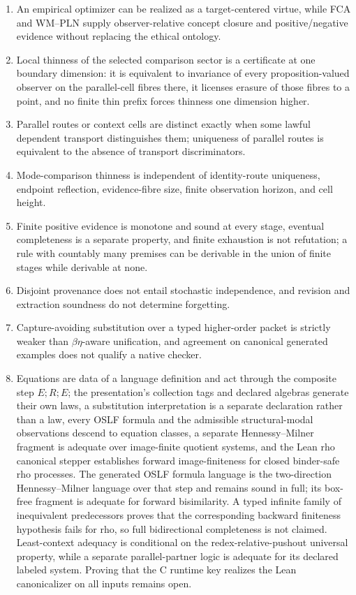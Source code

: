 \documentclass[11pt]{article}
\theoremstyle{definition}
\theoremstyle{remark}
\begin{document}
\begin{enumerate}
  program behavior; it does not refute semantic paradigm equivalence.
\item An empirical optimizer can be realized as a target-centered virtue, while
  FCA and WM--PLN supply observer-relative concept closure and positive/negative
  evidence without replacing the ethical ontology.
\item Local thinness of the selected comparison sector is a certificate at one
  boundary dimension: it is equivalent to invariance of every
  proposition-valued observer on the parallel-cell fibres there, it licenses
  erasure of those fibres to a point, and no finite thin prefix forces
  thinness one dimension higher.
\item Parallel routes or context cells are distinct exactly when some lawful
  dependent transport distinguishes them; uniqueness of parallel routes is
  equivalent to the absence of transport discriminators.
\item Mode-comparison thinness is independent of identity-route uniqueness,
  endpoint reflection, evidence-fibre size, finite observation horizon, and
  cell height.
\item Finite positive evidence is monotone and sound at every stage, eventual
  completeness is a separate property, and finite exhaustion is not
  refutation; a rule with countably many premises can be derivable in the
  union of finite stages while derivable at none.
\item Disjoint provenance does not entail stochastic independence, and
  revision and extraction soundness do not determine forgetting.
\item Capture-avoiding substitution over a typed higher-order packet is strictly
  weaker than $\beta\eta$-aware unification, and agreement on canonical
  generated examples does not qualify a native checker.
\item Equations are data of a language definition and act through the
  composite step $E;R;E$; the presentation's collection tags and declared
  algebras generate their own laws, a substitution interpretation is a
  separate declaration rather than a law, every OSLF formula and the
  admissible structural-modal observations descend to equation classes, a
  separate Hennessy--Milner fragment is adequate over image-finite quotient
  systems, and the Lean rho canonical stepper establishes forward
  image-finiteness for closed binder-safe rho processes.  The generated OSLF
  formula language is the two-direction Hennessy--Milner language over that
  step and remains sound in full; its box-free fragment is adequate for
  forward bisimilarity.  A typed infinite family of inequivalent predecessors
  proves that the corresponding backward finiteness hypothesis fails for rho,
  so full bidirectional completeness is not claimed.  Least-context adequacy
  is conditional on the redex-relative-pushout universal property, while a
  separate parallel-partner logic is adequate for its declared labeled
  system.  Proving that the C runtime key realizes the Lean canonicalizer on
  all inputs remains open.
\end{enumerate}
\end{document}

